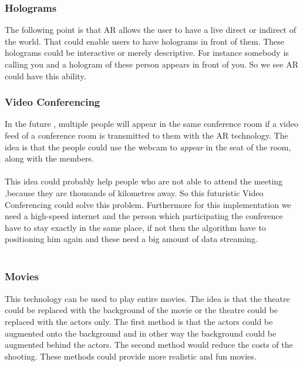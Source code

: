  \subsubsection{Holograms}
 The following point is that AR allows  the user to have a live direct or indirect of the world. That could enable users to have holograms in front of them. These holograms could be interactive or merely descriptive.  For instance somebody is calling you and a hologram of these person appears in front of you. So we see AR could have this ability.\cite{AugmentedBook}
 \subsubsection{Video Conferencing}
 In the future , multiple people will appear in the same conference room if a video feed of a conference room is  transmitted to them with the AR technology.  The idea is that the people could use  the webcam to \textit{appear} in the seat of the room, along with the members.\cite{AugmentedBook}
 \\
 \\
 This idea could probably help people who are not able to attend the meeting ,because they are thousands of kilometres away. So this futuristic Video Conferencing could solve this problem. Furthermore for this implementation we need a high-speed internet and the person which participating the conference have to stay  exactly in the same place, if not then the algorithm have to positioning him again and these need a big amount of data streaming.\cite{AugmentedBook}
 \\
 \\
 \subsubsection{Movies}
 This technology can be used  to play entire movies.  The idea is that the theatre could be replaced with the background of the movie  or the theatre could be replaced with the actors only.  The first method is that the actors could be augmented onto the background and in  other way the background could be augmented behind the actors. The second method would reduce the costs of the shooting. These methods could provide more realistic and fun movies.\cite{AugmentedBook}
 \\
 \\
